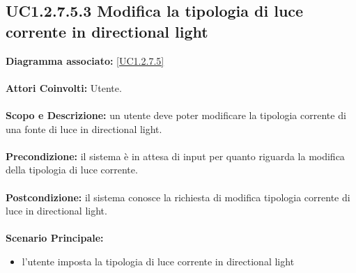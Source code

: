 \subsection{UC1.2.7.5.3 Modifica la tipologia di luce corrente in directional light}
\textbf{Diagramma associato:}
\ref{UC1.2.7.5} \\ \\
\textbf{Attori Coinvolti:}
Utente. \\ \\
\textbf{Scopo e Descrizione:}
un utente deve poter modificare la tipologia corrente di una fonte di luce in directional light. \\ \\
\textbf{Precondizione:}
il sistema è in attesa di input per quanto riguarda la modifica della tipologia di luce corrente. \\ \\
\textbf{Postcondizione:}
il sistema conosce la richiesta di modifica tipologia corrente di luce in directional light. \\ \\
\textbf{Scenario Principale:}
\begin{itemize}
\item l'utente imposta la tipologia di luce corrente in directional light
\\ \\ \end{itemize}


